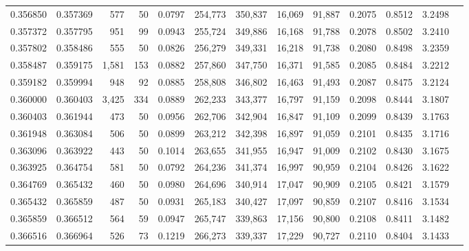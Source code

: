\begin{tabular}{rrrrrrrrrrrrr}
0.356850 & 0.357369 &   577 &  50 &                                     0.0797 & 254,773 & 350,837 &  16,069 &  91,887 & 0.2075 & 0.8512 & 3.2498 \\
0.357372 & 0.357795 &   951 &  99 &                                     0.0943 & 255,724 & 349,886 &  16,168 &  91,788 & 0.2078 & 0.8502 & 3.2410 \\
0.357802 & 0.358486 &   555 &  50 &                                     0.0826 & 256,279 & 349,331 &  16,218 &  91,738 & 0.2080 & 0.8498 & 3.2359 \\
0.358487 & 0.359175 & 1,581 & 153 &                                     0.0882 & 257,860 & 347,750 &  16,371 &  91,585 & 0.2085 & 0.8484 & 3.2212 \\
0.359182 & 0.359994 &   948 &  92 &                                     0.0885 & 258,808 & 346,802 &  16,463 &  91,493 & 0.2087 & 0.8475 & 3.2124 \\
0.360000 & 0.360403 & 3,425 & 334 &                                     0.0889 & 262,233 & 343,377 &  16,797 &  91,159 & 0.2098 & 0.8444 & 3.1807 \\
0.360403 & 0.361944 &   473 &  50 &                                     0.0956 & 262,706 & 342,904 &  16,847 &  91,109 & 0.2099 & 0.8439 & 3.1763 \\
0.361948 & 0.363084 &   506 &  50 &                                     0.0899 & 263,212 & 342,398 &  16,897 &  91,059 & 0.2101 & 0.8435 & 3.1716 \\
0.363096 & 0.363922 &   443 &  50 &                                     0.1014 & 263,655 & 341,955 &  16,947 &  91,009 & 0.2102 & 0.8430 & 3.1675 \\
0.363925 & 0.364754 &   581 &  50 &                                     0.0792 & 264,236 & 341,374 &  16,997 &  90,959 & 0.2104 & 0.8426 & 3.1622 \\
0.364769 & 0.365432 &   460 &  50 &                                     0.0980 & 264,696 & 340,914 &  17,047 &  90,909 & 0.2105 & 0.8421 & 3.1579 \\
0.365432 & 0.365859 &   487 &  50 &                                     0.0931 & 265,183 & 340,427 &  17,097 &  90,859 & 0.2107 & 0.8416 & 3.1534 \\
0.365859 & 0.366512 &   564 &  59 &                                     0.0947 & 265,747 & 339,863 &  17,156 &  90,800 & 0.2108 & 0.8411 & 3.1482 \\
0.366516 & 0.366964 &   526 &  73 &                                     0.1219 & 266,273 & 339,337 &  17,229 &  90,727 & 0.2110 & 0.8404 & 3.1433 \\

\end{tabular}

